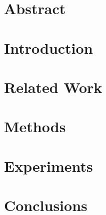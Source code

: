 \documentclass[letter,11pt]{article}
\theoremstyle{plain}
\theoremstyle{definition}
\theoremstyle{plain}
\theoremstyle{definition}
\begin{document}
	\pagebreak
	\section{Abstract}
	\label{abs_lbl}
	
	
	\section{Introduction}
	\label{intro_lbl}
	
	
	\section{Related Work}
	\label{related_lbl}
	
	
	\section{Methods}
	\label{methods_lbl}
	
	
	\section{Experiments}
	\label{experiments_lbl}
	
	
	\section{Conclusions}
	\label{conclusions_lbl}
	
		
\end{document}
